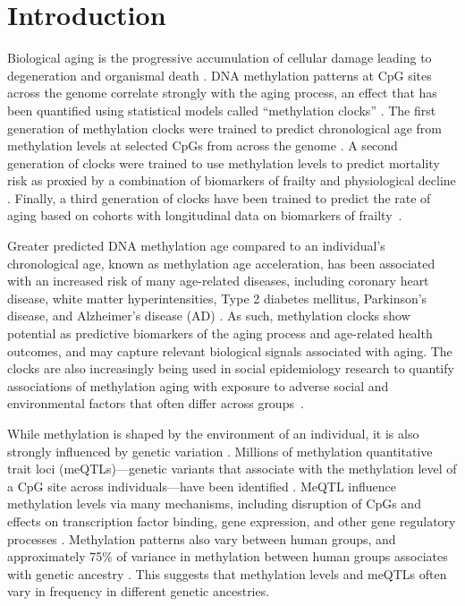 \section{Introduction}
\noindent
Biological aging is the progressive accumulation of cellular damage leading to degeneration and organismal death \citep{aunan_molecular_2016}. DNA methylation patterns at CpG sites across the genome correlate strongly with the aging process, an effect that has been quantified using statistical models called ``methylation clocks'' \citep{jones_span_2015}. The first generation of methylation clocks were trained to predict chronological age from methylation levels at selected CpGs from across the genome \citep{horvath_dna_2013, hannum_genome-wide_2013, zhang_improved_2019}. A second generation of clocks were trained to use methylation levels to predict mortality risk as proxied by a combination of biomarkers of frailty and physiological decline \citep{levine_epigenetic_2018, lu_dna_2019}. Finally, a third generation of clocks have been trained to predict the rate of aging based on cohorts with longitudinal data on biomarkers of frailty~\citep{belsky_dunedinpace_2022}.

Greater predicted DNA methylation age compared to an individual's chronological age, known as methylation age acceleration, has been associated with an increased risk of many age-related diseases, including coronary heart disease, white matter hyperintensities, Type 2 diabetes mellitus, Parkinson's disease, and Alzheimer's disease (AD) \citep{horvath_epigenetic_2016, lu_dna_2019, raina_cerebral_2017, hodgson_epigenetic_2017, horvath_increased_2015, levine_epigenetic_2015, levine_epigenetic_2018}. As such, methylation clocks show potential as predictive biomarkers of the aging process and age-related health outcomes, and may capture relevant biological signals associated with aging. The clocks are also increasingly being used in social epidemiology research to quantify associations of methylation aging with exposure to adverse social and environmental factors that often differ across groups~\citep{non_social_2021, aiello_familial_2024, chiu_essential_2024, krieger_epigenetic_2024}.

While methylation is shaped by the environment of an individual, it is also strongly influenced by genetic variation \citep{kader_dna_2017}. Millions of methylation quantitative trait loci (meQTLs)---genetic variants that associate with the methylation level of a CpG site across individuals---have been identified \citep{smith_methylation_2014}. MeQTL influence methylation levels via many mechanisms, including disruption of CpGs and effects on transcription factor binding, gene expression, and other gene regulatory processes \citep{oliva_dna_2023, banovich_methylation_2014}. Methylation patterns also vary between human groups, and approximately 75\% of variance in methylation between human groups associates with genetic ancestry \citep{galanter_differential_2017}. This suggests that methylation levels and meQTLs often vary in frequency in different genetic ancestries. 

